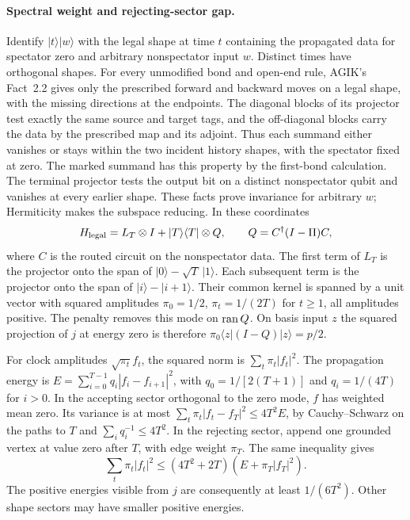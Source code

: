 \documentclass[11pt]{article}
\newcommand{\ket}[1]{\lvert #1\rangle}
\newcommand{\bra}[1]{\langle #1\rvert}
\begin{document}
\paragraph{Spectral weight and rejecting-sector gap.}
Identify \(\ket t\ket w\) with the legal shape at time \(t\) containing the propagated data for spectator zero and arbitrary nonspectator input \(w\). Distinct times have orthogonal shapes. For every unmodified bond and open-end rule, AGIK's Fact~2.2 gives only the prescribed forward and backward moves on a legal shape, with the missing directions at the endpoints. The diagonal blocks of its projector test exactly the same source and target tags, and the off-diagonal blocks carry the data by the prescribed map and its adjoint. Thus each summand either vanishes or stays within the two incident history shapes, with the spectator fixed at zero. The marked summand has this property by the first-bond calculation. The terminal projector tests the output bit on a distinct nonspectator qubit and vanishes at every earlier shape. These facts prove invariance for arbitrary \(w\); Hermiticity makes the subspace reducing. In these coordinates
\[
 H_{\rm legal}=L_T\otimes I+\ket T\bra T\otimes Q,\qquad Q=C^\dagger(I-\Pi)C ,
\]
where \(C\) is the routed circuit on the nonspectator data. The first term of \(L_T\) is the projector onto the span of \(\ket0-\sqrt T\,\ket1\). Each subsequent term is the projector onto the span of \(\ket i-\ket{i+1}\). Their common kernel is spanned by a unit vector with squared amplitudes \(\pi_0=1/2\), \(\pi_t=1/(2T)\) for \(t\ge1\), all amplitudes positive. The penalty removes this mode on \({\rm ran}\,Q\). On basis input \(z\) the squared projection of \(j\) at energy zero is therefore \(\pi_0\bra z(I-Q)\ket z=p/2\).

For clock amplitudes \(\sqrt{\pi_t}f_t\), the squared norm is \(\sum_t\pi_t|f_t|^2\). The propagation energy is \(E=\sum_{i=0}^{T-1}q_i|f_i-f_{i+1}|^2\), with \(q_0=1/[2(T+1)]\) and \(q_i=1/(4T)\) for \(i>0\). In the accepting sector orthogonal to the zero mode, \(f\) has weighted mean zero. Its variance is at most \(\sum_t\pi_t|f_t-f_T|^2\le4T^2 E\), by Cauchy--Schwarz on the paths to \(T\) and \(\sum_i q_i^{-1}\le4T^2\). In the rejecting sector, append one grounded vertex at value zero after \(T\), with edge weight \(\pi_T\). The same inequality gives
\[
 \sum_t\pi_t|f_t|^2\le(4T^2+2T)(E+\pi_T|f_T|^2).
\]
The positive energies visible from \(j\) are consequently at least \(1/(6T^2)\). Other shape sectors may have smaller positive energies.
\end{document}
